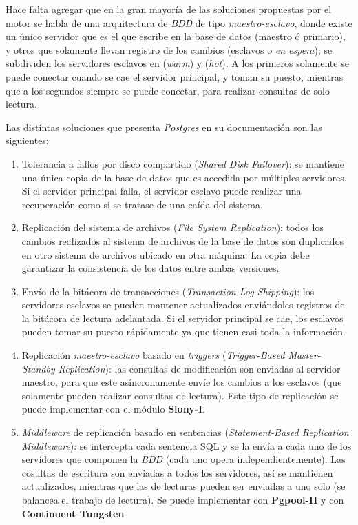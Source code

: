 Hace falta agregar que en la gran mayoría de las soluciones propuestas por el motor se habla de una arquitectura de \emph{BDD} de tipo \emph{maestro-esclavo}, donde existe un único servidor que es el que escribe en la base de datos (maestro ó primario), y otros que solamente llevan registro de los cambios (esclavos o \emph{en espera}); se subdividen los servidores esclavos en  (\emph{warm}) y  (\emph{hot}). A los primeros solamente se puede conectar cuando se cae el servidor principal, y toman su puesto, mientras que a los segundos siempre se puede conectar, para realizar consultas de solo lectura.

Las distintas soluciones que presenta \emph{Postgres} en su documentación son las siguientes:
\begin{enumerate}
    \item Tolerancia a fallos por disco compartido (\emph{Shared Disk Failover}): se mantiene una única copia de la base de datos que es accedida por múltiples servidores. Si el servidor principal falla, el servidor esclavo puede realizar una recuperación como si se tratase de una caída del sistema.

    \item Replicación del sistema de archivos (\emph{File System Replication}): todos los cambios realizados al sistema de archivos de la base de datos son duplicados en otro sistema de archivos ubicado en otra máquina. La copia debe garantizar la consistencia de los datos entre ambas versiones.

    \item Envío de la bitácora de transacciones (\emph{Transaction Log Shipping}): los servidores esclavos se pueden mantener actualizados enviándoles registros de la bitácora de lectura adelantada. Si el servidor principal se cae, los esclavos pueden tomar su puesto rápidamente ya que tienen casi toda la información.

    \item Replicación \emph{maestro-esclavo} basado en \emph{triggers} (\emph{Trigger-Based Master-Standby Replication}): las consultas de modificación son enviadas al servidor maestro, para que este asíncronamente envíe los cambios a los esclavos (que solamente pueden realizar consultas de lectura). Este tipo de replicación se puede implementar con el módulo \textbf{Slony-I}. 

    \item \emph{Middleware} de replicación basado en sentencias (\emph{Statement-Based Replication Middleware}): se intercepta cada sentencia SQL y se la envía a cada uno de los servidores que componen la \emph{BDD} (cada uno opera independientemente). Las cosultas de escritura son enviadas a todos los servidores, así se mantienen actualizados, mientras que las de lecturas pueden ser enviadas a uno solo (se balancea el trabajo de lectura). Se puede implementar con \textbf{Pgpool-II} y con \textbf{Continuent Tungsten}  


\end{enumerate}
